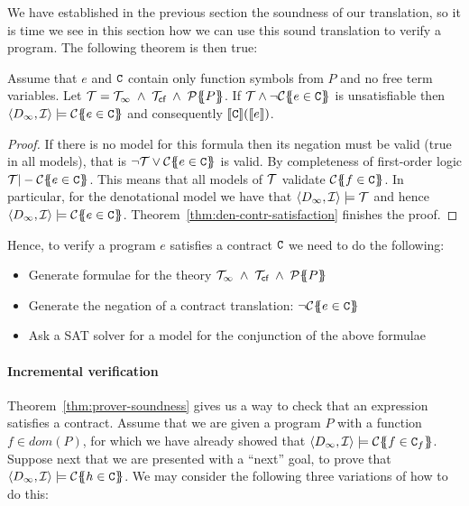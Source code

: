 We have established in the previous section the soundness of our translation, so it is time 
we see in this section how we can use this sound translation to verify a program. 
The following theorem is then true:

\begin{theorem}[Soundness]\label{thm:prover-soundness}
Assume that $e$ and $\Ct$ contain only function symbols from $P$ and no free term variables.
Let $\Th = \Th_\infty\;\land\;\Th_\lcfZ\;\land\;\ptrans{}{P}$. 
If $\Th \land \neg\ctrans{\Sigma}{P}{e \in \Ct}$ is unsatisfiable 
then $\langle D_\infty,{\cal I}\rangle \models \ctrans{\Sigma}{P}{e \in \Ct}$ and 
consequently $\dbrace{\Ct}(\dbrace{e})$.
\end{theorem}
\begin{proof}
If there is no model for this formula then its negation must be valid (true in all models), that 
is $ \neg \Th \lor \ctrans{\Sigma}{P}{e \in \Ct}$ is valid. By completeness
of first-order logic $\Th |- \ctrans{\Sigma}{P}{e \in \Ct}$. This means 
that all models of $\Th$ validate $\ctrans{\Sigma}{P}{f \in \Ct}$. In particular, 
for the denotational model we have that $\langle D_\infty,{\cal I}\rangle \models \Th$ 
and hence $\langle D_\infty,{\cal I} \rangle \models \ctrans{\Sigma}{P}{e \in \Ct}$. 
Theorem~\ref{thm:den-contr-satisfaction} finishes the proof.
\end{proof}

Hence, to verify a program $e$ satisfies a contract $\Ct$ we need to do the following:
\begin{itemize}
  \item Generate formulae for the theory $\Th_\infty\;\land\;\Th_\lcfZ\;\land\;\ptrans{}{P}$
  \item Generate the negation of a contract translation: $\neg\ctrans{\Sigma}{P}{e \in \Ct}$
  \item Ask a SAT solver for a model for the conjunction of the above formulae
\end{itemize}

\paragraph{Incremental verification}

Theorem~\ref{thm:prover-soundness} gives us a way to check that an expression satisfies a 
contract. Assume that we are given a program $P$ with a function $f \in dom(P)$, for which 
we have already showed that $\langle D_\infty,{\cal I}\rangle \models \ctrans{\Sigma}{P}{f \in \Ct_f}$.
Suppose next that we are presented with a ``next'' goal, to prove that 
$\langle D_\infty,{\cal I}\rangle \models \ctrans{\Sigma}{P}{h \in \Ct}$. 
We may consider the following three variations of how to do this:

